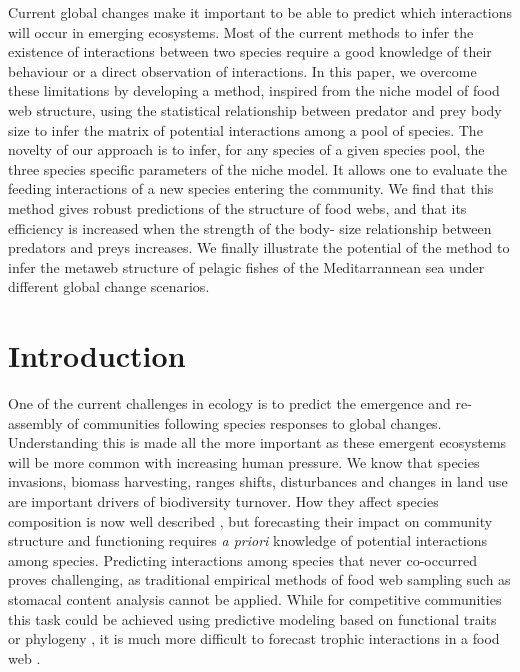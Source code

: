 \documentclass[12pt]{article}
\begin{document}
Current global changes make it important to be able to predict which
interactions will occur in emerging ecosystems. Most of the current methods to
infer the existence of interactions between two species require a good knowledge
of their behaviour or a direct observation of interactions. In this paper, we
overcome these limitations by developing a method, inspired from the niche model
of food web structure, using the statistical relationship between predator and
prey body size to infer the matrix of potential interactions among a pool of
species.  The novelty of our approach is to infer, for any species of a given
species pool, the three species specific parameters of the niche model. It
allows one to evaluate the feeding interactions of a new species entering the
community. We find that this method gives robust predictions of the structure of
food webs, and that its efficiency is increased when the strength of the body-
size relationship between predators and preys increases. We finally illustrate
the potential of the method to infer the metaweb structure of pelagic fishes of
the Meditarrannean sea under different global change scenarios.

\newpage

\section{Introduction}
One of the current challenges in ecology is to predict the emergence and re-assembly of communities following species responses to global changes. Understanding this is made all the more important as these emergent ecosystems will be more common with increasing human pressure. We know that species invasions, biomass harvesting, ranges shifts, disturbances and changes in land use are important drivers of biodiversity turnover. How they affect species composition is now well described \parencite{Pereira2010}, but forecasting their impact on community structure and functioning requires \emph{a priori} knowledge of potential interactions among species. Predicting interactions among species that never co-occurred proves challenging, as traditional empirical methods of food web sampling such as stomacal content analysis cannot be applied. While for competitive communities this task could be achieved using predictive modeling based on functional traits \parencite{McGill2006, Albouy2010} or phylogeny \parencite{Cavender-Bares2009, Mouquet2012} , it is much more difficult to forecast trophic interactions in a food web \parencite{Ings2009, Tylianakis2008,Montoya2010}.
\end{document}

